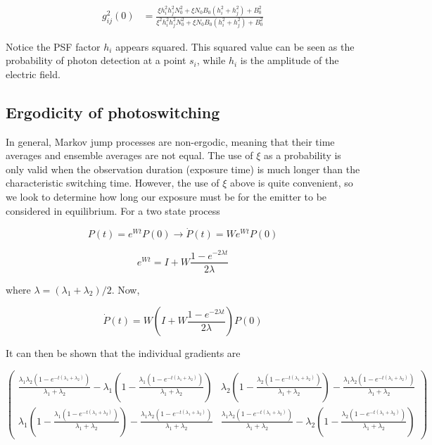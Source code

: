 \begin{align*}
g^{2}_{ij}(0) &= \frac{\xi h_{i}^{2}h_{j}^{2}N_{0}^{2} + \xi N_{0}B_{0}(h_{i}^{2} + h_{j}^{2}) + B_{0}^{2}}{\xi^{2} h_{i}^{2}h_{j}^{2}N_{0}^{2} + \xi N_{0}B_{0}(h_{i}^{2}+h_{j}^{2}) +  B_{0}^{2}}
\end{align*}

Notice the PSF factor $h_{i}$ appears squared. This squared value can be seen as the probability of photon detection at a point $s_i$, while $h_{i}$ is the amplitude of the electric field. 

\subsection{Ergodicity of photoswitching}

In general, Markov jump processes are non-ergodic, meaning that their time averages and ensemble averages are not equal. The use of $\xi$ as a probability is only valid when the observation duration (exposure time) is much longer than the characteristic switching time. However, the use of $\xi$ above is quite convenient, so we look to determine how long our exposure must be for the emitter to be considered in equilibrium. For a two state process

\begin{equation*}
P(t) = e^{Wt}P(0)\rightarrow \dot{P}(t) = We^{Wt}P(0)
\end{equation*}

\begin{equation*}
e^{Wt} = I + W\frac{1-e^{-2\lambda t}}{2\lambda}
\end{equation*}

where $\lambda = (\lambda_1 + \lambda_2)/2$. Now,

\begin{equation*}
\dot{P}(t) = W\left(I + W\frac{1-e^{-2\lambda t}}{2\lambda}\right)P(0)
\end{equation*}

It can then be shown that the individual gradients are


\begin{equation*}
\begin{pmatrix}
\frac{\lambda_1 \lambda_2 \left(1-e^{-t (\lambda_1+\lambda_2)}\right)}{\lambda_1+\lambda_2}-\lambda_1 \left(1-\frac{\lambda_1 \left(1-e^{-t (\lambda_1+\lambda_2)}\right)}{\lambda_1+\lambda_2}\right) & \lambda_2 \left(1-\frac{\lambda_2 \left(1-e^{-t (\lambda_1+\lambda_2)}\right)}{\lambda_1+\lambda_2}\right)-\frac{\lambda_1 \lambda_2 \left(1-e^{-t (\lambda_1+\lambda_2)}\right)}{\lambda_1+\lambda_2} \\
\lambda_1 \left(1-\frac{\lambda_1 \left(1-e^{-t (\lambda_1+\lambda_2)}\right)}{\lambda_1+\lambda_2}\right)-\frac{\lambda_1 \lambda_2 \left(1-e^{-t (\lambda_1+\lambda_2)}\right)}{\lambda_1+\lambda_2} & \frac{\lambda_1 \lambda_2 \left(1-e^{-t (\lambda_1+\lambda_2)}\right)}{\lambda_1+\lambda_2}-\lambda_2 \left(1-\frac{\lambda_2 \left(1-e^{-t (\lambda_1+\lambda_2)}\right)}{\lambda_1+\lambda_2}\right)
\end{pmatrix}
\end{equation*}



